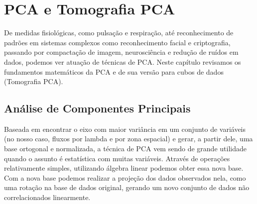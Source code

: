 


\chapter{PCA e Tomografia PCA}
\label{sec:PCAeTomoPCA}

De medidas fisiológicas, como pulsação e respiração, até reconhecimento de padrões em sistemas complexos como
reconhecimento facial e criptografia, passando por compactação de imagem, neurosciência e redução de ruídos em dados,
podemos ver atuação de técnicas de PCA. Neste capítulo revisamos os fundamentos matemáticos da PCA e de sua versão para
cubos de dados (Tomografia PCA).


\section{Análise de Componentes Principais}
\label{sec:PCAeTomoPCA:PCA}

Baseada em encontrar o eixo com maior variância em um conjunto de variáveis (no nosso caso, fluxos por lambda e por zona
espacial) e gerar, a partir dele, uma base ortogonal e normalizada, a técnica de PCA vem sendo de grande utilidade
quando o assunto é estatística com muitas variáveis. Através de operações relativamente simples, utilizando álgebra
linear podemos obter essa nova base. Com a nova base podemos realizar a projeção dos dados observados nela, como uma
rotação na base de dados original, gerando um novo conjunto de dados não correlacionados linearmente.


